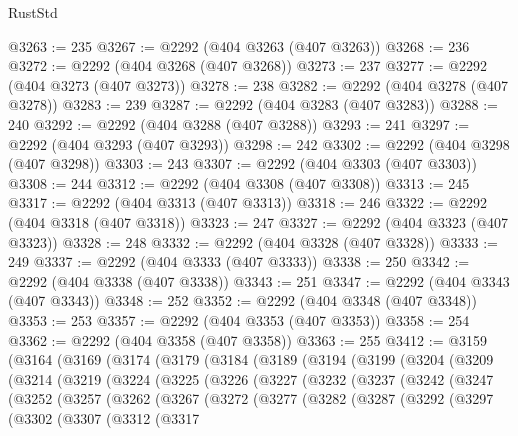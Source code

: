 \begin{lexlean}{RustStd}
\begin{coremodule}
@3263 := 235
@3267 := @2292 (@404 @3263 (@407 @3263))
@3268 := 236
@3272 := @2292 (@404 @3268 (@407 @3268))
@3273 := 237
@3277 := @2292 (@404 @3273 (@407 @3273))
@3278 := 238
@3282 := @2292 (@404 @3278 (@407 @3278))
@3283 := 239
@3287 := @2292 (@404 @3283 (@407 @3283))
@3288 := 240
@3292 := @2292 (@404 @3288 (@407 @3288))
@3293 := 241
@3297 := @2292 (@404 @3293 (@407 @3293))
@3298 := 242
@3302 := @2292 (@404 @3298 (@407 @3298))
@3303 := 243
@3307 := @2292 (@404 @3303 (@407 @3303))
@3308 := 244
@3312 := @2292 (@404 @3308 (@407 @3308))
@3313 := 245
@3317 := @2292 (@404 @3313 (@407 @3313))
@3318 := 246
@3322 := @2292 (@404 @3318 (@407 @3318))
@3323 := 247
@3327 := @2292 (@404 @3323 (@407 @3323))
@3328 := 248
@3332 := @2292 (@404 @3328 (@407 @3328))
@3333 := 249
@3337 := @2292 (@404 @3333 (@407 @3333))
@3338 := 250
@3342 := @2292 (@404 @3338 (@407 @3338))
@3343 := 251
@3347 := @2292 (@404 @3343 (@407 @3343))
@3348 := 252
@3352 := @2292 (@404 @3348 (@407 @3348))
@3353 := 253
@3357 := @2292 (@404 @3353 (@407 @3353))
@3358 := 254
@3362 := @2292 (@404 @3358 (@407 @3358))
@3363 := 255
@3412 := @3159
    (@3164
      (@3169
        (@3174
          (@3179
            (@3184
              (@3189
                (@3194
                  (@3199
                    (@3204
                      (@3209
                        (@3214
                          (@3219
                            (@3224
                              (@3225
                                (@3226
                                  (@3227
                                    (@3232
                                      (@3237
                                        (@3242
                                          (@3247
                                            (@3252
                                              (@3257
                                                (@3262
                                                  (@3267
                                                    (@3272
                                                      (@3277
                                                        (@3282
                                                          (@3287
                                                            (@3292
                                                              (@3297
                                                                (@3302
                                                                  (@3307
                                                                    (@3312
                                                                      (@3317

\end{coremodule}
\end{lexlean}
